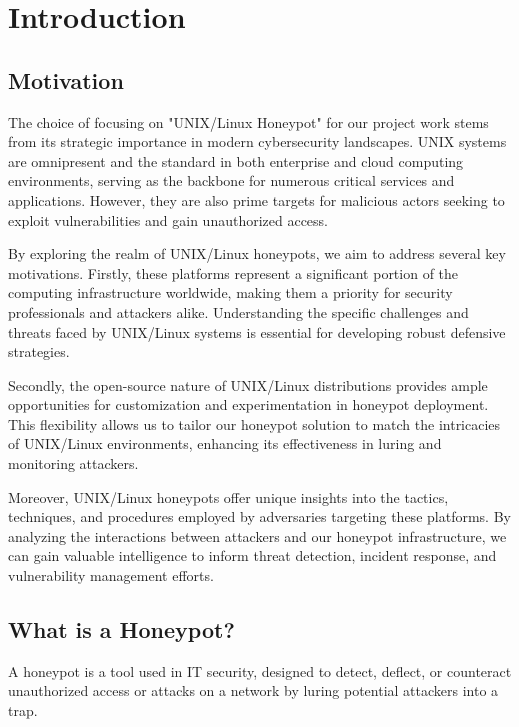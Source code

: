 \chapter{Introduction}
\label{chap:einleitung}


\section{Motivation}\label{sec:motivation}

The choice of focusing on "UNIX/Linux Honeypot" for our project work stems from its strategic importance in modern cybersecurity landscapes. UNIX systems are omnipresent and the standard in both enterprise and cloud computing environments, serving as the backbone for numerous critical services and applications. However, they are also prime targets for malicious actors seeking to exploit vulnerabilities and gain unauthorized access.

By exploring the realm of UNIX/Linux honeypots, we aim to address several key motivations. Firstly, these platforms represent a significant portion of the computing infrastructure worldwide, making them a priority for security professionals and attackers alike. Understanding the specific challenges and threats faced by UNIX/Linux systems is essential for developing robust defensive strategies.

Secondly, the open-source nature of UNIX/Linux distributions provides ample opportunities for customization and experimentation in honeypot deployment. This flexibility allows us to tailor our honeypot solution to match the intricacies of UNIX/Linux environments, enhancing its effectiveness in luring and monitoring attackers.

Moreover, UNIX/Linux honeypots offer unique insights into the tactics, techniques, and procedures employed by adversaries targeting these platforms. By analyzing the interactions between attackers and our honeypot infrastructure, we can gain valuable intelligence to inform threat detection, incident response, and vulnerability management efforts.

\section{What is a Honeypot?}\label{sec:ziele}

A honeypot is a tool used in IT security, designed to detect, deflect, or counteract unauthorized access or attacks on a network by luring potential attackers into a trap.

